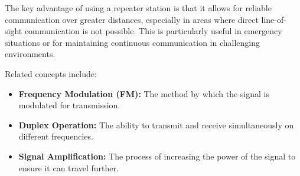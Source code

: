 The key advantage of using a repeater station is that it allows for reliable communication over greater distances, especially in areas where direct line-of-sight communication is not possible. This is particularly useful in emergency situations or for maintaining continuous communication in challenging environments.

Related concepts include:
\begin{itemize}
    \item \textbf{Frequency Modulation (FM):} The method by which the signal is modulated for transmission.
    \item \textbf{Duplex Operation:} The ability to transmit and receive simultaneously on different frequencies.
    \item \textbf{Signal Amplification:} The process of increasing the power of the signal to ensure it can travel further.
\end{itemize}

